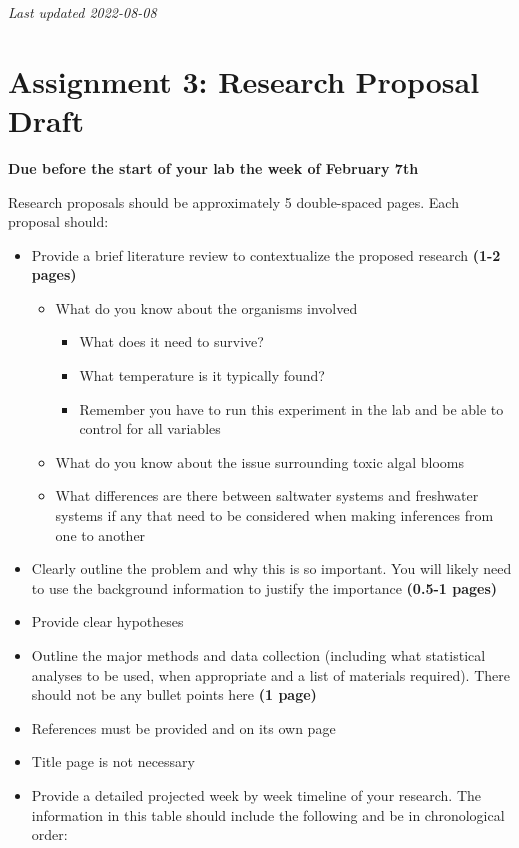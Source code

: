 \documentclass[
]{book}
\providecommand{\tightlist}{%
  \setlength{\itemsep}{0pt}\setlength{\parskip}{0pt}}
\begin{document}
\emph{Last updated 2022-08-08}

\hypertarget{assignment-3-research-proposal-draft}{%
\chapter*{Assignment 3: Research Proposal Draft}\label{assignment-3-research-proposal-draft}}

\textbf{Due before the start of your lab the week of February 7th}

Research proposals should be approximately 5 double-spaced pages. Each proposal should:

\begin{itemize}
\tightlist
\item
  Provide a brief literature review to contextualize the proposed research \textbf{(1-2 pages)}

  \begin{itemize}
  \tightlist
  \item
    What do you know about the organisms involved

    \begin{itemize}
    \tightlist
    \item
      What does it need to survive?
    \item
      What temperature is it typically found?
    \item
      Remember you have to run this experiment in the lab and be able to control for all variables
    \end{itemize}
  \item
    What do you know about the issue surrounding toxic algal blooms
  \item
    What differences are there between saltwater systems and freshwater systems if any that need to be considered when making inferences from one to another
  \end{itemize}
\item
  Clearly outline the problem and why this is so important. You will likely need to use the background information to justify the importance \textbf{(0.5-1 pages)}
\item
  Provide clear hypotheses
\item
  Outline the major methods and data collection (including what statistical analyses to be used, when appropriate and a list of materials required). There should not be any bullet points here \textbf{(1 page)}
\item
  References must be provided and on its own page
\item
  Title page is not necessary
\item
  Provide a detailed projected week by week timeline of your research. The information in this table should include the following and be in chronological order:


\end{itemize}
\end{document}
